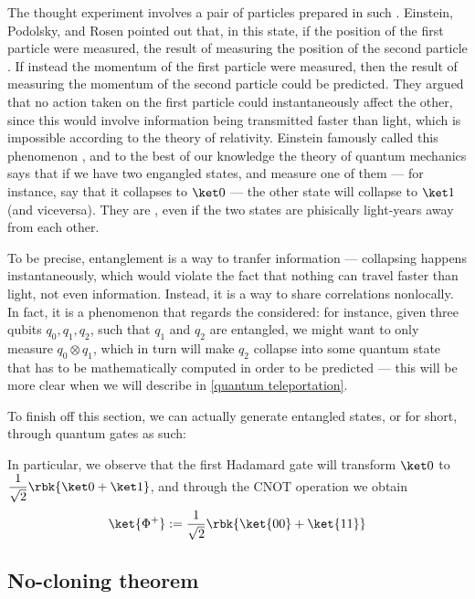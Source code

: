 \documentclass[a4paper, 12pt]{report}
\begin{document}
The thought experiment involves a pair of particles prepared in such . Einstein, Podolsky, and Rosen pointed out that, in this state, if the position of the first particle were measured, the result of measuring the position of the second particle . If instead the momentum of the first particle were measured, then the result of measuring the momentum of the second particle could be predicted. They argued that no action taken on the first particle could instantaneously affect the other, since this would involve information being transmitted faster than light, which is impossible according to the theory of relativity. Einstein famously called this phenomenon , and to the best of our knowledge the theory of quantum mechanics says that if we have two engangled states, and measure one of them --- for instance, say that it collapses to $\ket 0$ --- the other state will  collapse to $\ket 1$ (and viceversa). They are , even if the two states are phisically light-years away from each other.

To be precise, entanglement is  a way to tranfer information --- collapsing happens instantaneously, which would violate the fact that nothing can travel faster than light, not even information. Instead, it is a way to share correlations nonlocally. In fact, it is a phenomenon that regards the  considered: for instance, given three qubits $q_0, q_1, q_2$, such that $q_1$ and $q_2$ are entangled, we might want to only measure $q_0 \otimes q_1$, which in turn will make $q_2$ collapse into some quantum state that has to be mathematically computed in order to be predicted --- this will be more clear when we will describe  in \cref{quantum teleportation}.

To finish off this section, we can actually generate entangled states, or  for short, through quantum gates as such:


In particular, we observe that the first Hadamard gate will transform $\ket 0$ to $\dfrac{1}{\sqrt 2}\rbk{\ket 0 + \ket 1}$, and through the CNOT operation we obtain $$\ket{\Phi^+} := \dfrac{1}{\sqrt 2}\rbk{\ket{00} + \ket{11}}$$

\subsection{No-cloning theorem}
\end{document}
